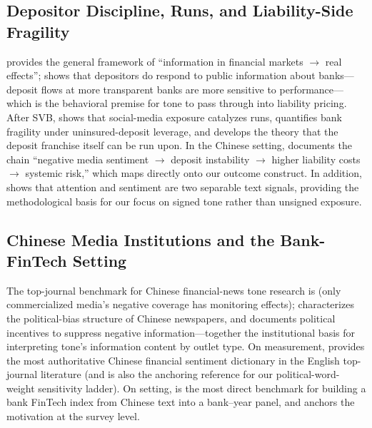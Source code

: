 \subsection{Depositor Discipline, Runs, and Liability-Side Fragility}
\textcite{goldstein2023information} provides the general framework of
``information in financial markets $\to$ real effects'';
\textcite{chen2022transparency} shows that depositors do respond to
public information about banks---deposit flows at more transparent
banks are more sensitive to performance---which is the behavioral
premise for tone to pass through into liability pricing. After SVB,
\textcite{cookson2026runcatalyst} shows that social-media exposure
catalyzes runs, \textcite{jiang2024fragility} quantifies bank fragility
under uninsured-deposit leverage, and \textcite{drechsler2026franchise}
develops the theory that the deposit franchise itself can be run upon.
In the Chinese setting, \textcite{fang2024mediadeposit} documents the
chain ``negative media sentiment $\to$ deposit instability $\to$ higher
liability costs $\to$ systemic risk,'' which maps directly onto our
outcome construct. In addition, \textcite{cookson2024socialsignal}
shows that attention and sentiment are two separable text signals,
providing the methodological basis for our focus on signed tone rather
than unsigned exposure.

\subsection{Chinese Media Institutions and the Bank-FinTech Setting}
The top-journal benchmark for Chinese financial-news tone research is
\textcite{you2018pen} (only commercialized media's negative coverage
has monitoring effects); \textcite{qin2018mediabias} characterizes the
political-bias structure of Chinese newspapers, and
\textcite{piotroski2015political} documents political incentives to
suppress negative information---together the institutional basis for
interpreting tone's information content by outlet type. On
measurement, \textcite{du2022dictionary} provides the most
authoritative Chinese financial sentiment dictionary in the English
top-journal literature (and is also the anchoring reference for our
political-word-weight sensitivity ladder). On setting,
\textcite{cheng2020bankfintech} is the most direct benchmark for
building a bank FinTech index from Chinese text into a bank--year
panel, and \textcite{berg2022fintechlending} anchors the motivation at
the survey level.

